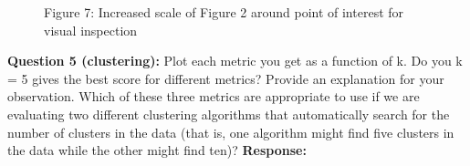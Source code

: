 \documentclass[12pt,article]{article}
\begin{document}
\begin{figure}[H]
\begin{minipage}{.42\textwidth}
  \captionsetup{labelformat=empty}
  \caption{\scriptsize{{Figure 7: Increased scale of Figure 2 around point of interest for visual inspection}}}
\end{minipage}
\end{figure}

\textbf{Question 5 (clustering):} \newline
Plot each metric you get as a function of k. Do you k = 5 gives the best score for different metrics? Provide
an explanation for your observation. Which of these three metrics are appropriate to use if we are evaluating
two different clustering algorithms that automatically search for the number of clusters in the data (that is,
one algorithm might find five clusters in the data while the other might find ten)? \newline
\newpage
\textbf{Response:}\newline
\end{document}
